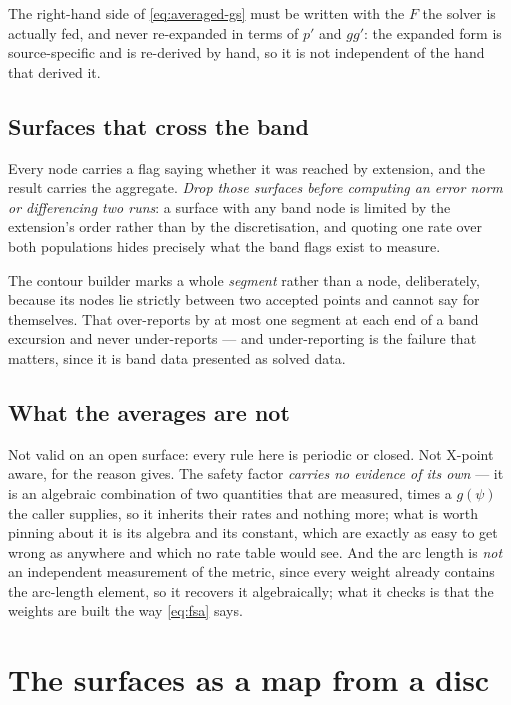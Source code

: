The right-hand side of \eqref{eq:averaged-gs} must be written with the $F$ the
solver is actually fed, and never re-expanded in terms of $p'$ and $gg'$: the
expanded form is source-specific and is re-derived by hand, so it is not
independent of the hand that derived it.

\subsection{Surfaces that cross the band}

Every node carries a flag saying whether it was reached by extension, and the
result carries the aggregate. \emph{Drop those surfaces before computing an error
norm or differencing two runs}: a surface with any band node is limited by the
extension's order rather than by the discretisation, and quoting one rate over
both populations hides precisely what the band flags exist to measure.

The contour builder marks a whole \emph{segment} rather than a node,
deliberately, because its nodes lie strictly between two accepted points and
cannot say for themselves. That over-reports by at most one segment at each end
of a band excursion and never under-reports --- and under-reporting is the
failure that matters, since it is band data presented as solved data.

\subsection{What the averages are not}

Not valid on an open surface: every rule here is periodic or closed. Not X-point
aware, for the reason  gives. The safety factor \emph{carries no
evidence of its own} --- it is an algebraic combination of two quantities that
are measured, times a $g(\psi)$ the caller supplies, so it inherits their rates
and nothing more; what is worth pinning about it is its algebra and its constant,
which are exactly as easy to get wrong as anywhere and which no rate table would
see. And the arc length is \emph{not} an independent measurement of the metric,
since every weight already contains the arc-length element, so it recovers it
algebraically; what it checks is that the weights are built the way
\eqref{eq:fsa} says.

\section{The surfaces as a map from a disc}
\label{sec:disc}

